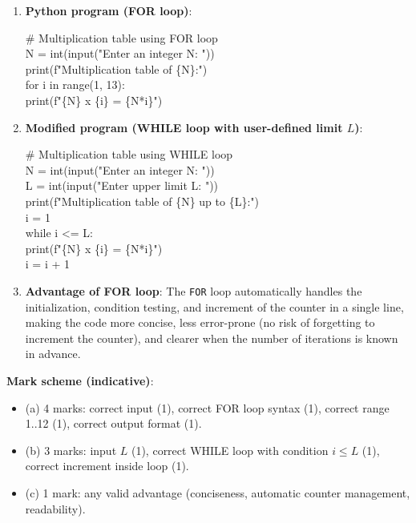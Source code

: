 \documentclass[11pt]{article}
\begin{document}
\begin{corrige}
\begin{enumerate}
\item \textbf{Python program (FOR loop)}:
\begin{flushleft}\ttfamily\small
\# Multiplication table using FOR loop\\
N = int(input("Enter an integer N: "))\\
print(f"Multiplication table of \{N\}:")\\
for i in range(1, 13):\\
\quad print(f"\{N\} x \{i\} = \{N*i\}")
\end{flushleft}
\item \textbf{Modified program (WHILE loop with user-defined limit $L$)}:
\begin{flushleft}\ttfamily\small
\# Multiplication table using WHILE loop\\
N = int(input("Enter an integer N: "))\\
L = int(input("Enter upper limit L: "))\\
print(f"Multiplication table of \{N\} up to \{L\}:")\\
i = 1\\
while i <= L:\\
\quad print(f"\{N\} x \{i\} = \{N*i\}")\\
\quad i = i + 1
\end{flushleft}
\item \textbf{Advantage of FOR loop}: The \texttt{FOR} loop automatically handles the initialization, condition testing, and increment of the counter in a single line, making the code more concise, less error-prone (no risk of forgetting to increment the counter), and clearer when the number of iterations is known in advance.
\end{enumerate}

\textbf{Mark scheme (indicative)}:
\begin{itemize}
\item (a) 4 marks: correct input (1), correct FOR loop syntax (1), correct range 1..12 (1), correct output format (1).
\item (b) 3 marks: input $L$ (1), correct WHILE loop with condition $i \leq L$ (1), correct increment inside loop (1).
\item (c) 1 mark: any valid advantage (conciseness, automatic counter management, readability).
\end{itemize}
\end{corrige}
\end{document}
